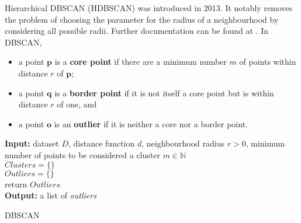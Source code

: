 Hierarchical DBSCAN (HDBSCAN) \cite{HDBSCAN} was introduced in 2013.
It notably removes the problem of choosing the parameter for the radius of a neighbourhood by considering all possible radii. 
Further documentation can be found at \cite{HDBSCAN_code}. \newl 
In DBSCAN, 
\begin{itemize}[noitemsep]
\item a point $\mathbf{p}$ is a \textbf{core point} if there are a minimum number $m$ of points within distance $r$ of $\mathbf{p}$;
\item a point $\mathbf{q}$ is a \textbf{border point} if it is not itself a core point but is within distance $r$ of one, and 
\item a point $\mathbf{o}$ is an \textbf{outlier} if it is neither a core nor a border point.
\end{itemize}
\begin{algorithm}[h]
\SetAlgoLined
\textbf{Input:} dataset $D$,
distance function $d$,
neighbourhood radius $r>0$,
minimum number of points to be considered a cluster $m\in\mathbb{N}$
\\$\textit{Clusters} = \{\}$
\\$\textit{Outliers} = \{\}$
\\
return $\textit{Outliers}$
\\\textbf{Output:} a list of \textit{outliers}
\caption{DBSCAN}
\label{dbscan}
\end{algorithm}








